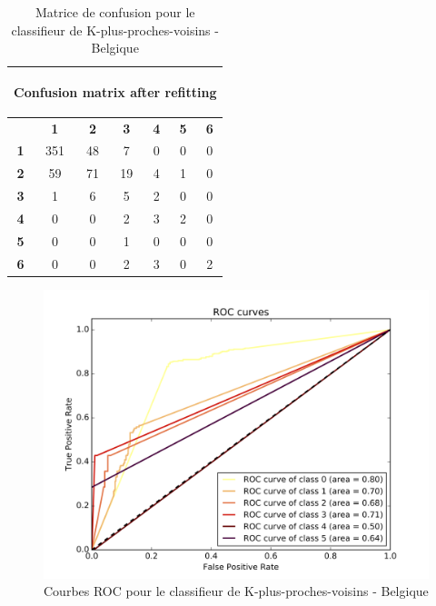 \documentclass{book}
\begin{document}
\begin{table}[H]
  \begin{center}
  \begin{adjustbox}{max width=\textwidth}
  \begin{tabular}{|c|c|c|c|c|c|c|}
    \hline
    \multicolumn{7}{|c|}{{ \begin{bf}Confusion matrix after refitting\end{bf}}} \\
    \hline
     & \textbf{1} & \textbf{2} & \textbf{3} & \textbf{4} & \textbf{5} & \textbf{6}\\
    \hline
    \textbf{1} & 351 & 48 & 7 & 0 & 0 & 0\\
    \hline
    \textbf{2} & 59 & 71 & 19 & 4 & 1 & 0\\
    \hline
    \textbf{3} & 1 & 6 & 5 & 2 & 0 & 0\\
    \hline
    \textbf{4} & 0 & 0 & 2 & 3 & 2 & 0\\
    \hline
    \textbf{5} & 0 & 0 & 1 & 0 & 0 & 0\\
    \hline
    \textbf{6} & 0 & 0 & 2 & 3 & 0 & 2\\
    \hline
  \end{tabular}
  \end{adjustbox}
  \end{center}
  \caption{Matrice de confusion pour le classifieur de K-plus-proches-voisins - Belgique}
  \label{knn_cm_belgique}
\end{table}

\begin{figure}[H]
 \begin{center}
\includegraphics[scale=0.4]{../../data/Belgique/test/Nearest_Neighboors_Classification/Nearest_Neighboors_Classification_roc.png}
 \end{center}
 \caption{Courbes ROC pour le classifieur de K-plus-proches-voisins - Belgique}
 \label{knn_roc_belgique}
\end{figure}
\end{document}
